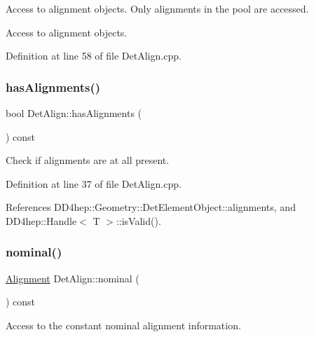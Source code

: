 Access to alignment objects. Only alignments in the pool are accessed. 

Access to alignment objects. 

Definition at line 58 of file Det\+Align.\+cpp.

\hypertarget{class_d_d4hep_1_1_alignments_1_1_det_align_a8198a1f2a3da12d30afabb639b1194d8}{}\label{class_d_d4hep_1_1_alignments_1_1_det_align_a8198a1f2a3da12d30afabb639b1194d8} 
\subsubsection{\texorpdfstring{has\+Alignments()}{hasAlignments()}}
{\footnotesize\ttfamily bool Det\+Align\+::has\+Alignments (\begin{DoxyParamCaption}{ }\end{DoxyParamCaption}) const}



Check if alignments are at all present. 



Definition at line 37 of file Det\+Align.\+cpp.



References D\+D4hep\+::\+Geometry\+::\+Det\+Element\+Object\+::alignments, and D\+D4hep\+::\+Handle$<$ T $>$\+::is\+Valid().

\hypertarget{class_d_d4hep_1_1_alignments_1_1_det_align_a950279ebf8f3870594b41e81b0b69db4}{}\label{class_d_d4hep_1_1_alignments_1_1_det_align_a950279ebf8f3870594b41e81b0b69db4} 
\subsubsection{\texorpdfstring{nominal()}{nominal()}}
{\footnotesize\ttfamily \hyperlink{class_d_d4hep_1_1_alignments_1_1_alignment}{Alignment} Det\+Align\+::nominal (\begin{DoxyParamCaption}{ }\end{DoxyParamCaption}) const}



Access to the constant nominal alignment information. 

